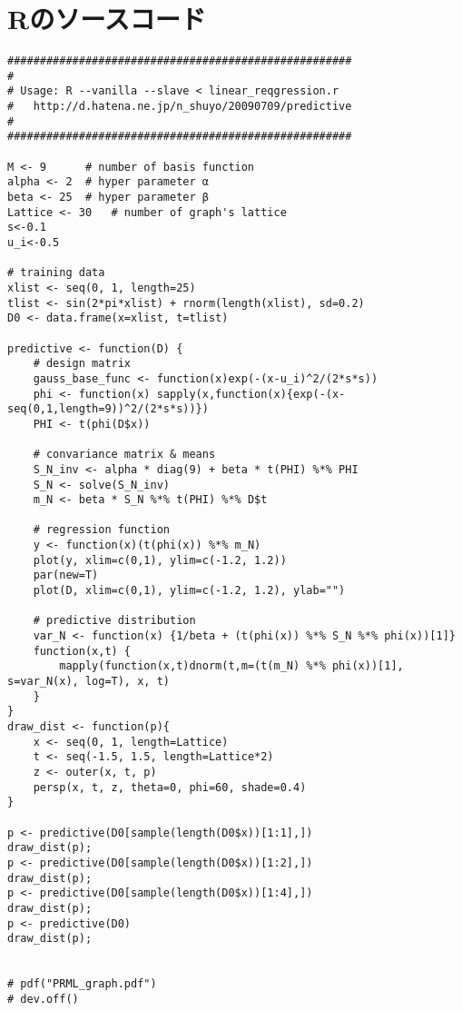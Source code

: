 \documentclass[uplatex]{jsarticle}
\begin{document}
\section{Rのソースコード}
\begin{lstlisting}[basicstyle=\ttfamily\footnotesize, frame=single]
#####################################################
#
# Usage: R --vanilla --slave < linear_reqgression.r
# 	http://d.hatena.ne.jp/n_shuyo/20090709/predictive
#
#####################################################

M <- 9		# number of basis function
alpha <- 2	# hyper parameter α
beta <- 25	# hyper parameter β
Lattice <- 30	# number of graph's lattice
s<-0.1
u_i<-0.5

# training data
xlist <- seq(0, 1, length=25)
tlist <- sin(2*pi*xlist) + rnorm(length(xlist), sd=0.2)
D0 <- data.frame(x=xlist, t=tlist)

predictive <- function(D) {
    # design matrix
    gauss_base_func <- function(x)exp(-(x-u_i)^2/(2*s*s))
    phi <- function(x) sapply(x,function(x){exp(-(x-seq(0,1,length=9))^2/(2*s*s))})
    PHI <- t(phi(D$x))

    # convariance matrix & means
    S_N_inv <- alpha * diag(9) + beta * t(PHI) %*% PHI
    S_N <- solve(S_N_inv)
    m_N <- beta * S_N %*% t(PHI) %*% D$t

    # regression function
    y <- function(x)(t(phi(x)) %*% m_N)
    plot(y, xlim=c(0,1), ylim=c(-1.2, 1.2))
    par(new=T)
    plot(D, xlim=c(0,1), ylim=c(-1.2, 1.2), ylab="")

    # predictive distribution
    var_N <- function(x) {1/beta + (t(phi(x)) %*% S_N %*% phi(x))[1]}
    function(x,t) {
        mapply(function(x,t)dnorm(t,m=(t(m_N) %*% phi(x))[1], s=var_N(x), log=T), x, t)
    }
}
draw_dist <- function(p){
    x <- seq(0, 1, length=Lattice)
    t <- seq(-1.5, 1.5, length=Lattice*2)
    z <- outer(x, t, p)
    persp(x, t, z, theta=0, phi=60, shade=0.4)
}

p <- predictive(D0[sample(length(D0$x))[1:1],])
draw_dist(p);
p <- predictive(D0[sample(length(D0$x))[1:2],])
draw_dist(p);
p <- predictive(D0[sample(length(D0$x))[1:4],])
draw_dist(p);
p <- predictive(D0)
draw_dist(p);


# pdf("PRML_graph.pdf")
# dev.off()
\end{lstlisting}
\end{document}
